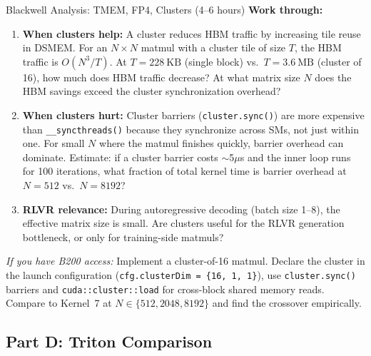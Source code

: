 \begin{exercise}{Blackwell Analysis: TMEM, FP4, Clusters (4--6 hours)}
\textbf{Work through:}
\begin{enumerate}
  \item \textbf{When clusters help:} A cluster reduces HBM traffic by increasing tile reuse in DSMEM. For an $N \times N$ matmul with a cluster tile of size $T$, the HBM traffic is $O(N^3 / T)$. At $T = 228~\text{KB}$ (single block) vs.\ $T = 3.6~\text{MB}$ (cluster of 16), how much does HBM traffic decrease? At what matrix size $N$ does the HBM savings exceed the cluster synchronization overhead?
  \item \textbf{When clusters hurt:} Cluster barriers (\texttt{cluster.sync()}) are more expensive than \texttt{\_\_syncthreads()} because they synchronize across SMs, not just within one. For small $N$ where the matmul finishes quickly, barrier overhead can dominate. Estimate: if a cluster barrier costs $\sim$5$\mu$s and the inner loop runs for 100 iterations, what fraction of total kernel time is barrier overhead at $N = 512$ vs.\ $N = 8192$?
  \item \textbf{RLVR relevance:} During autoregressive decoding (batch size 1--8), the effective matrix size is small. Are clusters useful for the RLVR generation bottleneck, or only for training-side matmuls?
\end{enumerate}

\textit{If you have B200 access:} Implement a cluster-of-16 matmul. Declare the cluster in the launch configuration (\texttt{cfg.clusterDim = \{16, 1, 1\}}), use \texttt{cluster.sync()} barriers and \texttt{cuda::cluster::load} for cross-block shared memory reads. Compare to Kernel~7 at $N \in \{512, 2048, 8192\}$ and find the crossover empirically.
\end{exercise}

\subsection{Part D: Triton Comparison}

